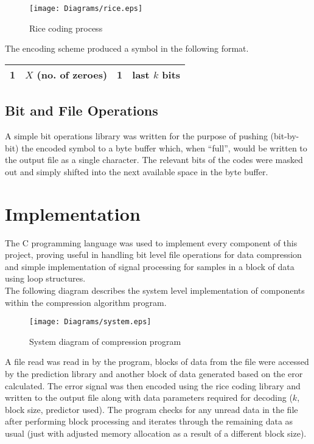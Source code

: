 \documentclass{article}
\begin{document}
\begin{figure}[!htb]
\centering
\texttt{[image: Diagrams/rice.eps]}
\caption{Rice coding process}
\label{fig:rice}
\end{figure}

The encoding scheme produced a symbol in the following format.\\

\begin{center}
\begin{tabular}{|r|c|c|l|}
  \hline
  \textbf{1} & $X$ (no. of zeroes) & \textbf{1} & last $k$ bits \\
  \hline
\end{tabular}
\end{center}

\subsection*{Bit and File Operations}
A simple bit operations library was written for the purpose of pushing (bit-by-bit) the encoded symbol to a byte buffer which, when ``full'', would be written to the output file as a single character. The relevant bits of the codes were masked out and simply shifted into the next available space in the byte buffer.\\ 

\section*{Implementation}
The C programming language was used to implement every component of this project, proving useful in handling bit level file operations for data compression and simple implementation of signal processing for samples in a block of data using loop structures.\\
 
The following diagram describes the system level implementation of components within the compression algorithm program.\\

\begin{figure}[!htb]
\centering
\texttt{[image: Diagrams/system.eps]}
\caption{System diagram of compression program}
\label{fig:digraph}
\end{figure}

A file read was read in by the program, blocks of data from the file were accessed by the prediction library and another block of data generated based on the eror calculated. The error signal was then encoded using the rice coding library and written to the output file along with data parameters required for decoding ($k$, block size, predictor used). The program checks for any unread data in the file after performing block processing and iterates through the remaining data as usual (just with adjusted memory allocation as a result of a different block size).\\
 
\end{document}
